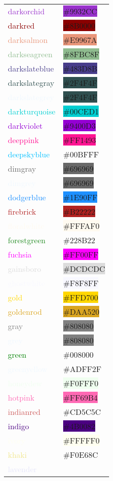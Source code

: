 \documentclass[
]{article}
\begin{document}
\begin{longtable}[]{@{}ll@{}}
\textcolor{darkorchid}{darkorchid} &
\colorbox{darkorchid}{\#9932CC}\tabularnewline
\textcolor{darkred}{darkred} &
\colorbox{darkred}{\#8B0000}\tabularnewline
\textcolor{darksalmon}{darksalmon} &
\colorbox{darksalmon}{\#E9967A}\tabularnewline
\textcolor{darkseagreen}{darkseagreen} &
\colorbox{darkseagreen}{\#8FBC8F}\tabularnewline
\textcolor{darkslateblue}{darkslateblue} &
\colorbox{darkslateblue}{\#483D8B}\tabularnewline
\textcolor{darkslategray}{darkslategray} &
\colorbox{darkslategray}{\#2F4F4F}\tabularnewline
\textcolor{aliceblue}{darkslategrey} &
\colorbox{darkslategray}{\#2F4F4F}\tabularnewline
\textcolor{darkturquoise}{darkturquoise} &
\colorbox{darkturquoise}{\#00CED1}\tabularnewline
\textcolor{darkviolet}{darkviolet} &
\colorbox{darkviolet}{\#9400D3}\tabularnewline
\textcolor{deeppink}{deeppink} &
\colorbox{deeppink}{\#FF1493}\tabularnewline
\textcolor{deepskyblue}{deepskyblue} &
\colorbox{capri}{\#00BFFF}\tabularnewline
\textcolor{dimgray}{dimgray} &
\colorbox{dimgray}{\#696969}\tabularnewline
\textcolor{aliceblue}{dimgrey} &
\colorbox{dimgray}{\#696969}\tabularnewline
\textcolor{dodgerblue}{dodgerblue} &
\colorbox{dodgerblue}{\#1E90FF}\tabularnewline
\textcolor{firebrick}{firebrick} &
\colorbox{firebrick}{\#B22222}\tabularnewline
\textcolor{floralwhite}{floralwhite} &
\colorbox{floralwhite}{\#FFFAF0}\tabularnewline
\textcolor{forestgreen}{forestgreen} &
\colorbox{indiagreen}{\#228B22}\tabularnewline
\textcolor{fuchsia}{fuchsia} &
\colorbox{fuchsia}{\#FF00FF}\tabularnewline
\textcolor{gainsboro}{gainsboro} &
\colorbox{gainsboro}{\#DCDCDC}\tabularnewline
\textcolor{ghostwhite}{ghostwhite} &
\colorbox{ghostwhite}{\#F8F8FF}\tabularnewline
\textcolor{gold}{gold} & \colorbox{gold}{\#FFD700}\tabularnewline
\textcolor{goldenrod}{goldenrod} &
\colorbox{goldenrod}{\#DAA520}\tabularnewline
\textcolor{gray}{gray} & \colorbox{gray}{\#808080}\tabularnewline
\textcolor{aliceblue}{grey} & \colorbox{gray}{\#808080}\tabularnewline
\textcolor{green}{green} &
\colorbox{officegreen}{\#008000}\tabularnewline
\textcolor{aliceblue}{greenyellow} &
\colorbox{green-yellow}{\#ADFF2F}\tabularnewline
\textcolor{honeydew}{honeydew} &
\colorbox{honeydew}{\#F0FFF0}\tabularnewline
\textcolor{hotpink}{hotpink} &
\colorbox{hotpink}{\#FF69B4}\tabularnewline
\textcolor{indianred}{indianred} &
\colorbox{chestnut}{\#CD5C5C}\tabularnewline
\textcolor{indigo}{indigo} & \colorbox{indigo}{\#4B0082}\tabularnewline
\textcolor{ivory}{ivory} & \colorbox{ivory}{\#FFFFF0}\tabularnewline
\textcolor{khaki}{khaki} &
\colorbox{lightkhaki}{\#F0E68C}\tabularnewline
\textcolor{lavender}{lavender} &

\end{longtable}
\end{document}
